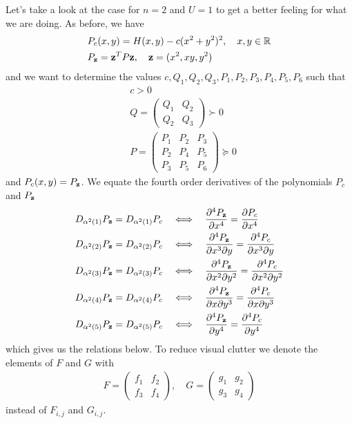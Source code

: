 \documentclass[a4paper,12pt,twoside,BCOR=10mm]{scrbook}
\begin{document}
Let's take a look at the case for $n = 2$ and $U = 1$ to get a better feeling for what we are doing. As before, we have
\begin{align*}
    &P_c(x, y) = H(x,y) - c(x^2 + y^2)^2, \quad x,y\in\mathbb{R}^{}\\
    &P_{\mathbf{z}} = \mathbf{z}^T P \mathbf{z}, \quad \mathbf{z} = (x^2, xy, y^2)
\end{align*}
and we want to determine the values $c, Q_1, Q_2,Q_3, P_1, P_2, P_3, P_4, P_5, P_6$ such that
\begin{align*}
    &c > 0\\
    &Q = \begin{pmatrix}
    Q_1 & Q_2\\
    Q_2 & Q_3
    \end{pmatrix}
    \succ 0\\
    &P = \begin{pmatrix}
    P_1 & P_2 & P_3\\
    P_2 & P_4 & P_5\\
    P_3 & P_5 & P_6
    \end{pmatrix}
    \succeq 0
\end{align*}
and $P_c(x ,y) = P_{\mathbf{z}}$. We equate the fourth order derivatives of the polynomials $P_c$ and $P_{\mathbf{z}}$
\begin{align}\label{RelationsSpecialCase}
    &D_{\alpha^2(1)} P_{\mathbf{z}} = D_{\alpha^2(1)} P_c \quad \Longleftrightarrow \quad \frac{\partial^4 P_{\mathbf{z}}}{\partial x^4} = \frac{\partial P_c}{\partial x^4} \nonumber\\
    &D_{\alpha^2(2)} P_{\mathbf{z}} = D_{\alpha^2(2)} P_c \quad \Longleftrightarrow \quad \frac{\partial^4 P_{\mathbf{z}}}{\partial x^3 \partial y} = \frac{\partial^4 P_c}{\partial x^3 \partial y}\nonumber\\
    &D_{\alpha^2(3)} P_{\mathbf{z}} = D_{\alpha^2(3)} P_c \quad \Longleftrightarrow \quad \frac{\partial^4 P_{\mathbf{z}}}{\partial x^2 \partial y^2} = \frac{\partial^4 P_c}{\partial x^2 \partial y^2}\\
    &D_{\alpha^2(4)} P_{\mathbf{z}} = D_{\alpha^2(4)} P_c \quad \Longleftrightarrow \quad \frac{\partial^4 P_{\mathbf{z}}}{\partial x \partial y^3} = \frac{\partial^4 P_c}{\partial x \partial y^3}\nonumber\\
    &D_{\alpha^2(5)} P_{\mathbf{z}} = D_{\alpha^2(5)} P_c \quad \Longleftrightarrow \quad \frac{\partial^4 P_{\mathbf{z}}}{\partial y^4} = \frac{\partial^4 P_c}{\partial y^4}\nonumber
\end{align}
which gives us the relations below. To reduce visual clutter we denote the elements of $F$ and $G$ with
\begin{align*}
    F = \begin{pmatrix}
    f_1 & f_2\\
    f_3 & f_4
    \end{pmatrix}
    , \quad
    G = \begin{pmatrix}
    g_1 & g_2\\
    g_3 & g_4
    \end{pmatrix}
\end{align*}
instead of $F_{i,j}$ and $G_{i,j}$.
\end{document}
